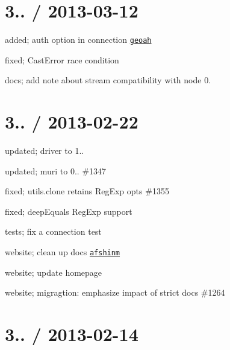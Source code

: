 \section*{3.. / 2013-\/03-\/12 }


\begin{DoxyItemize}
\item added; auth option in connection \href{https://github.com/geoah}{\tt geoah}
\item fixed; Cast\+Error race condition
\item docs; add note about stream compatibility with node 0.
\end{DoxyItemize}

\section*{3.. / 2013-\/02-\/22 }


\begin{DoxyItemize}
\item updated; driver to 1..
\item updated; muri to 0.. \#1347
\item fixed; utils.\+clone retains Reg\+Exp opts \#1355
\item fixed; deep\+Equals Reg\+Exp support
\item tests; fix a connection test
\item website; clean up docs \href{https://github.com/afshinm}{\tt afshinm}
\item website; update homepage
\item website; migragtion\+: emphasize impact of strict docs \#1264
\end{DoxyItemize}

\section*{3.. / 2013-\/02-\/14 }


